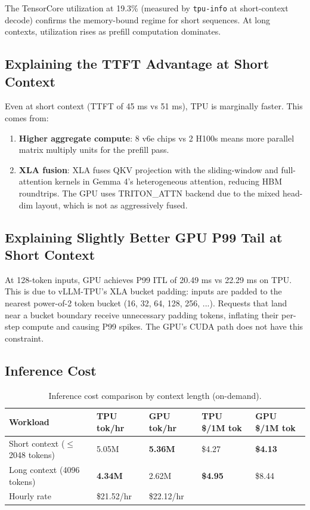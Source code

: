 \documentclass[11pt,a4paper]{article}
\begin{document}
The TensorCore utilization at 19.3\% (measured by \texttt{tpu-info} at short-context decode) confirms the memory-bound regime for short sequences. At long contexts, utilization rises as prefill computation dominates.

\subsection{Explaining the TTFT Advantage at Short Context}

Even at short context (TTFT of 45 ms vs 51 ms), TPU is marginally faster. This comes from:

\begin{enumerate}[nosep]
  \item \textbf{Higher aggregate compute}: 8 v6e chips vs 2 H100s means more parallel matrix multiply units for the prefill pass.
  \item \textbf{XLA fusion}: XLA fuses QKV projection with the sliding-window and full-attention kernels in Gemma 4's heterogeneous attention, reducing HBM roundtrips. The GPU uses TRITON\_ATTN backend due to the mixed head-dim layout, which is not as aggressively fused.
\end{enumerate}

\subsection{Explaining Slightly Better GPU P99 Tail at Short Context}

At 128-token inputs, GPU achieves P99 ITL of 20.49 ms vs 22.29 ms on TPU. This is due to vLLM-TPU's XLA bucket padding: inputs are padded to the nearest power-of-2 token bucket (16, 32, 64, 128, 256, ...). Requests that land near a bucket boundary receive unnecessary padding tokens, inflating their per-step compute and causing P99 spikes. The GPU's CUDA path does not have this constraint.

\subsection{Inference Cost}

\begin{table}[H]
\centering
\caption{Inference cost comparison by context length (on-demand).}
\begin{tabular}{lllll}
\toprule
\textbf{Workload} & \textbf{TPU tok/hr} & \textbf{GPU tok/hr} & \textbf{TPU \$/1M tok} & \textbf{GPU \$/1M tok} \\
\midrule
Short context ($\leq$2048 tokens) & 5.05M & \textbf{5.36M} & \$4.27 & \textbf{\$4.13} \\
Long context (4096 tokens) & \textbf{4.34M} & 2.62M & \textbf{\$4.95} & \$8.44 \\
\midrule
Hourly rate & \$21.52/hr & \$22.12/hr & & \\
\bottomrule
\end{tabular}
\end{table}
\end{document}
